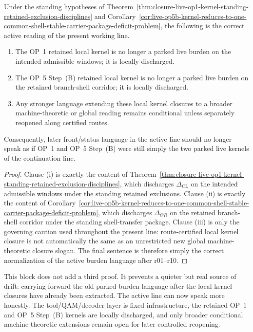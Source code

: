 \begin{proposition}
\label{prop:active-post-release-burden-language-distinguishes-local-kernel-closure-from-broader-conditional-readings}
Under the standing hypotheses of Theorem~\ref{thm:closure-live-op1-kernel-standing-retained-exclusion-disciplines} and Corollary~\ref{cor:live-op5b-kernel-reduces-to-one-common-shell-stable-carrier-package-deficit-problem}, the following is the correct active reading of the present working line.
\begin{enumerate}[leftmargin=2em,label=(\roman*)]
  \item The OP~1 retained local kernel is no longer a parked live burden on the intended admissible windows; it is locally discharged.
  \item The OP~5 Step~(B) retained local kernel is no longer a parked live burden on the retained branch-shell corridor; it is locally discharged.
  \item Any stronger language extending these local kernel closures to a broader machine-theoretic or global reading remains conditional unless separately reopened along certified routes.
\end{enumerate}
Consequently, later front/status language in the active line should no longer speak as if OP~1 and OP~5 Step~(B) were still simply the two parked live kernels of the continuation line.
\end{proposition}

\begin{proof}
Clause (i) is exactly the content of Theorem~\ref{thm:closure-live-op1-kernel-standing-retained-exclusion-disciplines}, which discharges \(\Delta_{\mathrm{CL}}\) on the intended admissible windows under the standing retained exclusions. Clause (ii) is exactly the content of Corollary~\ref{cor:live-op5b-kernel-reduces-to-one-common-shell-stable-carrier-package-deficit-problem}, which discharges \(\Delta_{\Theta R}\) on the retained branch-shell corridor under the standing shell-transfer package. Clause (iii) is only the governing caution used throughout the present line: route-certified local kernel closure is not automatically the same as an unrestricted new global machine-theoretic closure slogan. The final sentence is therefore simply the correct normalization of the active burden language after r01--r10.
\end{proof}

\begin{remark}
\label{rem:what-post-closure-normalization-buys}
This block does not add a third proof. It prevents a quieter but real source of drift: carrying forward the old parked-burden language after the local kernel closures have already been extracted. The active line can now speak more honestly. The tool/QAM/decoder layer is fixed infrastructure, the retained OP~1 and OP~5 Step~(B) kernels are locally discharged, and only broader conditional machine-theoretic extensions remain open for later controlled reopening.
\end{remark}


